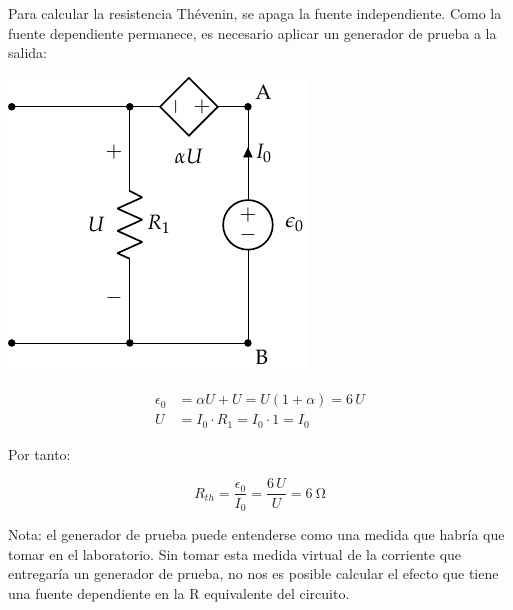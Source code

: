 Para calcular la resistencia Thévenin, se apaga la fuente independiente. Como la fuente dependiente permanece, es necesario aplicar un generador de prueba a la salida:

\vspace{3mm}

\begin{minipage}[c]{0.5\linewidth}
    \begin{center}
        \includegraphics[width=0.65\linewidth]{figuras/Thevenin1_fuenteprueba.pdf}
    \end{center}
\end{minipage}
\begin{minipage}[c]{0.5\linewidth}    
    \begin{align*}
      \epsilon_0 &= \alpha U + U = U(1+\alpha) = 6\,U\\[5pt]
      U &= I_0\cdot R_1 = I_0\cdot 1 = I_0
    \end{align*}

    \vspace{3mm}
    Por tanto:

    \begin{equation*}
      R_{th} = \dfrac{\epsilon_0}{I_0}=\dfrac{6\,U}{U} = \boxed{\qty{6}{\ohm}}
    \end{equation*}
\end{minipage}

\vspace{3mm}

Nota: el generador de prueba puede entenderse como una medida que habría que tomar en el laboratorio. Sin tomar esta medida virtual de la corriente que entregaría un generador de prueba, no nos es posible calcular el efecto que tiene una fuente dependiente en la R equivalente del circuito.

